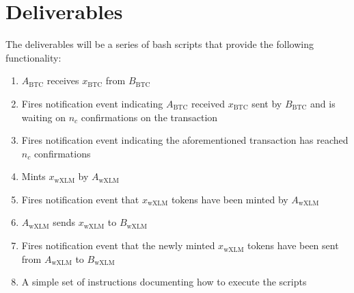 \section{Deliverables}
The deliverables will be a series of bash scripts that provide the following functionality:
\begin{enumerate}[noitemsep]
\item $A_\mathrm{BTC}$ receives $x_\mathrm{BTC}$ from $B_\mathrm{BTC}$
\item Fires notification event indicating $A_\mathrm{BTC}$ received $x_\mathrm{BTC}$ sent by $B_\mathrm{BTC}$ and is waiting on $n_c$ confirmations on the transaction
\item Fires notification event indicating the aforementioned transaction has reached $n_c$ confirmations
\item Mints $x_\mathrm{wXLM}$ by $A_\mathrm{wXLM}$
\item Fires notification event that $x_\mathrm{wXLM}$ tokens have been minted by $A_\mathrm{wXLM}$
\item $A_\mathrm{wXLM}$ sends $x_\mathrm{wXLM}$ to $B_\mathrm{wXLM}$
\item Fires notification event that the newly minted $x_\mathrm{wXLM}$ tokens have been sent from $A_\mathrm{wXLM}$ to $B_\mathrm{wXLM}$
\item A simple set of instructions documenting how to execute the scripts
\end{enumerate}
